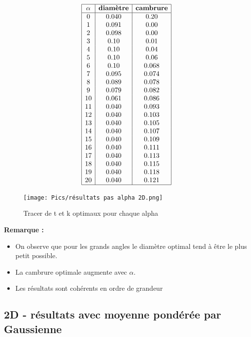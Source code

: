 \documentclass[conference]{IEEEtran}
\begin{document}
\[
\begin{array}{|c|c|c|}
    \hline
    \textbf{$\alpha$} & \textbf{diamètre} & \textbf{cambrure}\\
    \hline
    0 & 0.040 & 0.20 \\
    1 & 0.091 & 0.00 \\
    2 & 0.098 & 0.00 \\
    3 & 0.10 & 0.01  \\
    4 & 0.10 & 0.04  \\
    5 & 0.10 & 0.06  \\
    6 & 0.10 & 0.068  \\
    7 & 0.095 & 0.074 \\
    8 & 0.089 & 0.078 \\
    9 & 0.079 & 0.082 \\
    10 & 0.061 & 0.086 \\
    11 & 0.040 & 0.093 \\
    12 & 0.040 & 0.103 \\
    13 & 0.040 & 0.105 \\
    14 & 0.040 & 0.107 \\
    15 & 0.040 & 0.109 \\
    16 & 0.040 & 0.111 \\
    17 & 0.040 & 0.113 \\
    18 & 0.040 & 0.115 \\
    19 & 0.040 & 0.118 \\
    20 & 0.040 & 0.121 \\
    \hline
\end{array}
\]

\begin{figure}[H]
    \centering
    \texttt{[image: Pics/résultats pas alpha 2D.png]}  
    \caption{Tracer de t et k optimaux pour chaque alpha}
    \label{fig:t,k,alpha 2d}
\end{figure}

    \textbf{Remarque :} 
    \begin{itemize}
        \item On observe que pour les grands angles le diamètre optimal tend à être le plus petit possible.
        \item La cambrure optimale augmente avec $\alpha$.
        \item Les résultats sont cohérents en ordre de grandeur
    \end{itemize}

\subsection{2D - résultats avec moyenne pondérée par Gaussienne}
\end{document}
